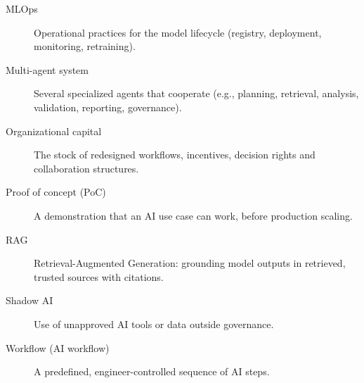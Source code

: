 \begin{description}
  \item[MLOps] Operational practices for the model lifecycle (registry,
        deployment, monitoring, retraining).
  \item[Multi-agent system] Several specialized agents that cooperate (e.g.,
        planning, retrieval, analysis, validation, reporting, governance).
  \item[Organizational capital] The stock of redesigned workflows,
        incentives, decision rights and collaboration structures.
  \item[Proof of concept (PoC)] A demonstration that an AI use case can work,
        before production scaling.
  \item[RAG] Retrieval-Augmented Generation: grounding model outputs in
        retrieved, trusted sources with citations.
  \item[Shadow AI] Use of unapproved AI tools or data outside governance.
  \item[Workflow (AI workflow)] A predefined, engineer-controlled sequence of
        AI steps.
\end{description}
